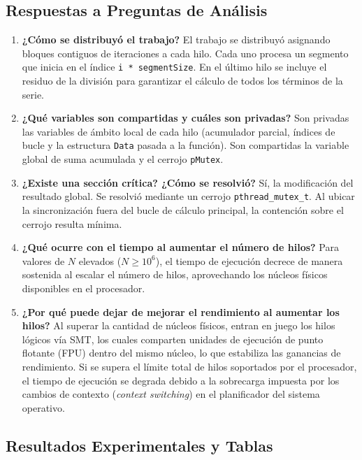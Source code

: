 \documentclass[11pt,a4paper]{article}
\begin{document}
\subsection{Respuestas a Preguntas de Análisis}
\begin{enumerate}
    \item \textbf{¿Cómo se distribuyó el trabajo?}
    El trabajo se distribuyó asignando bloques contiguos de iteraciones a cada hilo. Cada uno procesa un segmento que inicia en el índice \texttt{i * segmentSize}. En el último hilo se incluye el residuo de la división para garantizar el cálculo de todos los términos de la serie.

    \item \textbf{¿Qué variables son compartidas y cuáles son privadas?}
    Son privadas las variables de ámbito local de cada hilo (acumulador parcial, índices de bucle y la estructura \texttt{Data} pasada a la función). Son compartidas la variable global de suma acumulada y el cerrojo \texttt{pMutex}.

    \item \textbf{¿Existe una sección crítica? ¿Cómo se resolvió?}
    Sí, la modificación del resultado global. Se resolvió mediante un cerrojo \texttt{pthread\_mutex\_t}. Al ubicar la sincronización fuera del bucle de cálculo principal, la contención sobre el cerrojo resulta mínima.

    \item \textbf{¿Qué ocurre con el tiempo al aumentar el número de hilos?}
    Para valores de $N$ elevados ($N \ge 10^6$), el tiempo de ejecución decrece de manera sostenida al escalar el número de hilos, aprovechando los núcleos físicos disponibles en el procesador.

    \item \textbf{¿Por qué puede dejar de mejorar el rendimiento al aumentar los hilos?}
    Al superar la cantidad de núcleos físicos, entran en juego los hilos lógicos vía SMT, los cuales comparten unidades de ejecución de punto flotante (FPU) dentro del mismo núcleo, lo que estabiliza las ganancias de rendimiento. Si se supera el límite total de hilos soportados por el procesador, el tiempo de ejecución se degrada debido a la sobrecarga impuesta por los cambios de contexto (\textit{context switching}) en el planificador del sistema operativo.
\end{enumerate}

\subsection{Resultados Experimentales y Tablas}
\end{document}

